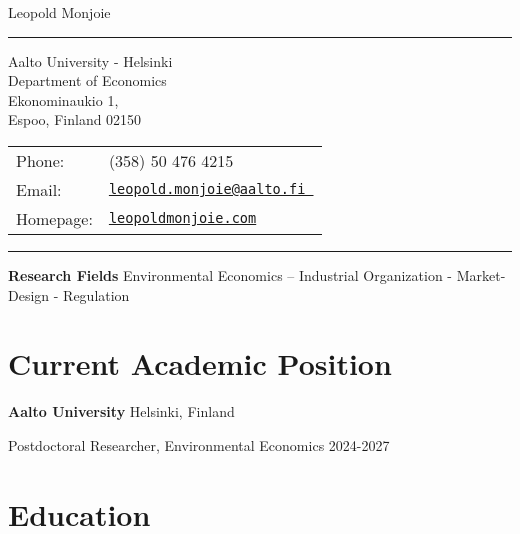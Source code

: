 \documentclass[letterpaper]{article}
\def\name{Leopold Monjoie}
\renewenvironment{itemize}{
  \begin{list}{}{
    \setlength{\leftmargin}{1.5em}
  }
}{
  \end{list}
}
\begin{document}
{\huge \name}

\vspace{0.1in}

\par\noindent\rule{\textwidth}{0.5pt}

\vspace{0.1in}


\begin{minipage}{0.45\linewidth}
  {Aalto University - Helsinki} \\
  Department of Economics \\
  Ekonominaukio 1,   \\
  Espoo, Finland 02150
\end{minipage}
\begin{minipage}{0.45\linewidth}
  \begin{tabular}{ll}
    Phone: & (358) 50 476 4215 \\
    Email: & \href{mailto:hotelling@unc.edu}{\tt leopold.monjoie@aalto.fi } \\
    Homepage: & \href{http://leopoldmonjoie.com/}{\tt leopoldmonjoie.com} \\
  \end{tabular}
\end{minipage}

\vspace{0.1in}

\par\noindent\rule{\textwidth}{0.5pt}


\vspace{0.5cm}

\textbf{Research Fields} Environmental Economics – Industrial Organization - Market-Design - Regulation


\section*{\textbf{Current Academic Position}}

\begin{itemize}
    \item \textbf{Aalto University}  \hfill \hfill  Helsinki, Finland
    \item Postdoctoral Researcher, Environmental Economics \hfill \hfill 2024-2027
\end{itemize}


\section*{\textbf{Education}}
\end{document}
